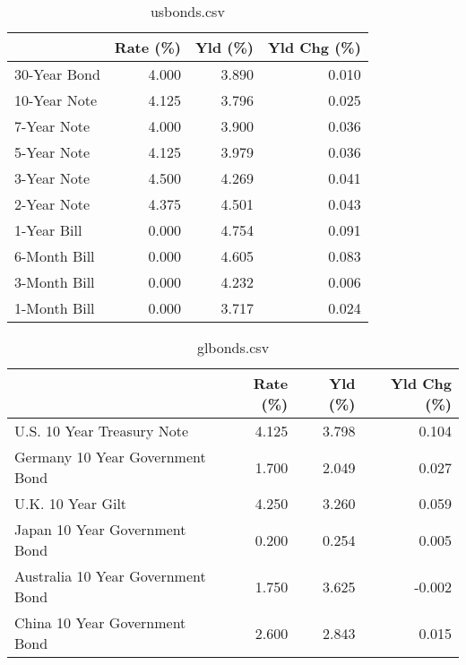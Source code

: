 \documentclass{article}%
\begin{document}
%


\begin{table}[htbp]%
\caption{usbonds.csv}%
\centering%
\begin{adjustbox}{width=1\textwidth}%
\begin{tabular}{lrrr}
\toprule
             &  Rate (\%) &  Yld (\%) &  Yld Chg (\%) \\
\midrule
30-Year Bond &     4.000 &    3.890 &        0.010 \\
10-Year Note &     4.125 &    3.796 &        0.025 \\
 7-Year Note &     4.000 &    3.900 &        0.036 \\
 5-Year Note &     4.125 &    3.979 &        0.036 \\
 3-Year Note &     4.500 &    4.269 &        0.041 \\
 2-Year Note &     4.375 &    4.501 &        0.043 \\
 1-Year Bill &     0.000 &    4.754 &        0.091 \\
6-Month Bill &     0.000 &    4.605 &        0.083 \\
3-Month Bill &     0.000 &    4.232 &        0.006 \\
1-Month Bill &     0.000 &    3.717 &        0.024 \\
\bottomrule
\end{tabular}
%
\end{adjustbox}%
\end{table}

%


\begin{table}[htbp]%
\caption{glbonds.csv}%
\centering%
\begin{adjustbox}{width=1\textwidth}%
\begin{tabular}{lrrr}
\toprule
                                  &  Rate (\%) &  Yld (\%) &  Yld Chg (\%) \\
\midrule
       U.S. 10 Year Treasury Note &     4.125 &    3.798 &        0.104 \\
  Germany 10 Year Government Bond &     1.700 &    2.049 &        0.027 \\
                U.K. 10 Year Gilt &     4.250 &    3.260 &        0.059 \\
    Japan 10 Year Government Bond &     0.200 &    0.254 &        0.005 \\
Australia 10 Year Government Bond &     1.750 &    3.625 &       -0.002 \\
    China 10 Year Government Bond &     2.600 &    2.843 &        0.015 \\
\bottomrule
\end{tabular}
%
\end{adjustbox}%
\end{table}
\end{document}
